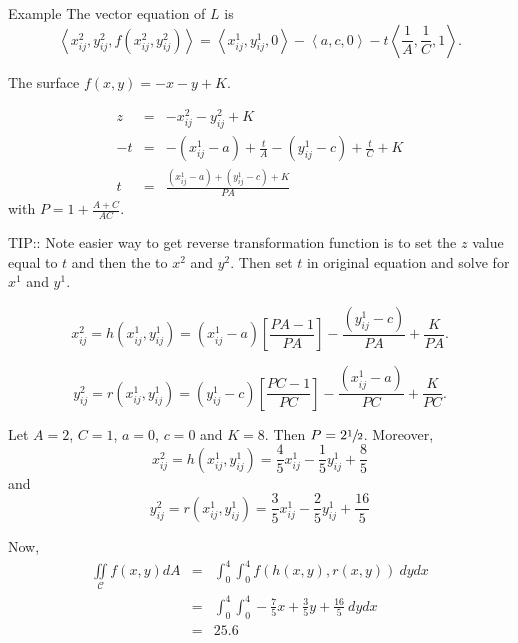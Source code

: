 \documentclass[a4paper,10pt]{article}
\begin{document}
\begin{section}{Example}
The vector equation of $L$ is
\begin{equation}
\left <x_{ij}^2,y_{ij}^2,f(x_{ij}^2,y_{ij}^2) \right > = \left < x_{ij}^1, y_{ij}^1, 0\right > - \left < a, c, 0\right > - t \left < \frac{1}{A},\frac{1}{C},1\right >.  
\end{equation}

The surface $f(x,y) = -x - y + K$.

\begin{eqnarray}
z &=& - x_{ij}^2 - y_{ij}^2 + K\\
-t &=& -(x_{ij}^1 - a) + \frac{t}{A} - (y_{ij}^1 - c) + \frac{t}{C} + K\\
t &=& \frac{(x_{ij}^1 - a) + (y_{ij}^1 - c) + K}{PA}
\end{eqnarray}
with $P = 1 + \frac{A+C}{AC}$.

TIP:: Note easier way to get reverse transformation function is to set the $z$ value equal to $t$ and then the to $x^2$ and $y^2$. Then set $t$ in original equation and solve for $x^1$ and $y^1$.

\begin{equation}
x_{ij}^2 = h(x_{ij}^1,y_{ij}^1) = (x_{ij}^1 - a)\left [ \frac{PA-1}{PA} \right ] - \frac{(y_{ij}^1 - c)}{PA} + \frac{K}{PA}.
\end{equation}

\begin{equation}
y_{ij}^2 = r(x_{ij}^1,y_{ij}^1) = (y_{ij}^1 - c)\left [ \frac{PC-1}{PC} \right ] - \frac{(x_{ij}^1 - a)}{PC} + \frac{K}{PC}.  
\end{equation}

Let $A=2$, $C=1$, $a = 0$, $c = 0$ and $K=8$. Then $P = 2\sfrac{1}{2}$. Moreover, 
\begin{equation}
x_{ij}^2 = h(x_{ij}^1,y_{ij}^1) = \frac{4}{5} x_{ij}^1 - \frac{1}{5} y_{ij}^1 + \frac{8}{5}  
\end{equation}
and
\begin{equation}
y_{ij}^2 = r(x_{ij}^1,y_{ij}^1) = \frac{3}{5} x_{ij}^1 - \frac{2}{5} y_{ij}^1 + \frac{16}{5}  
\end{equation}

Now,
\begin{eqnarray}
\iint\limits_{\!\mathcal{C}} f(x,y) dA &=& \int_0^4\int_0^4 f(h(x,y),r(x,y))~dydx\\
&=& \int_0^4 \int_0^4 -\frac{7}{5}x + \frac{3}{5} y + \frac{16}{5}~dydx\\
&=& 25.6
\end{eqnarray}




\end{section}
\end{document}
